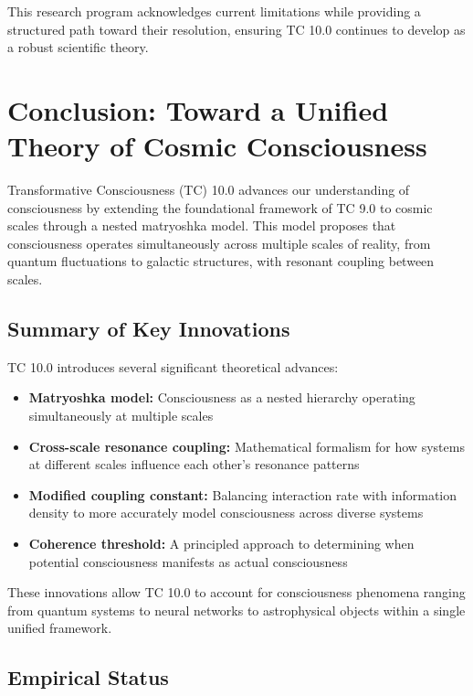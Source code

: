 \documentclass[12pt]{article}
\begin{document}
This research program acknowledges current limitations while providing a structured path toward their resolution, ensuring TC 10.0 continues to develop as a robust scientific theory.

\section{Conclusion: Toward a Unified Theory of Cosmic Consciousness}

Transformative Consciousness (TC) 10.0 advances our understanding of consciousness by extending the foundational framework of TC 9.0 to cosmic scales through a nested matryoshka model. This model proposes that consciousness operates simultaneously across multiple scales of reality, from quantum fluctuations to galactic structures, with resonant coupling between scales.

\subsection{Summary of Key Innovations}

TC 10.0 introduces several significant theoretical advances:

\begin{itemize}
    \item \textbf{Matryoshka model:} Consciousness as a nested hierarchy operating simultaneously at multiple scales
    
    \item \textbf{Cross-scale resonance coupling:} Mathematical formalism for how systems at different scales influence each other's resonance patterns
    
    \item \textbf{Modified coupling constant:} Balancing interaction rate with information density to more accurately model consciousness across diverse systems
    
    \item \textbf{Coherence threshold:} A principled approach to determining when potential consciousness manifests as actual consciousness
\end{itemize}

These innovations allow TC 10.0 to account for consciousness phenomena ranging from quantum systems to neural networks to astrophysical objects within a single unified framework.

\subsection{Empirical Status}
\end{document}
